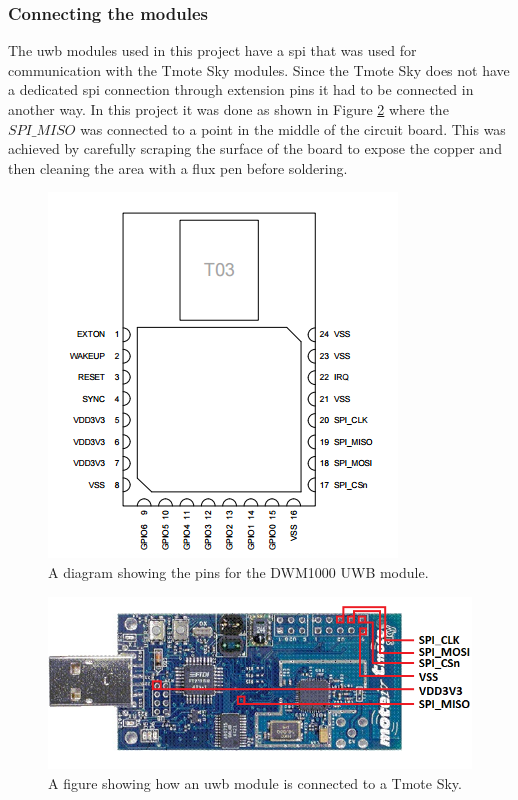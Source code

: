		\subsubsection{Connecting the modules}
			The \gls{uwb} modules used in this project have a \gls{spi} that was used for communication with the Tmote Sky modules. Since the Tmote Sky does not have a dedicated \gls{spi} connection through extension pins it had to be connected in another way. In this project it was done as shown in Figure \ref{fig_Tmote_connections} where the $SPI\_MISO$ was connected to a point in the middle of the circuit board. This was achieved by carefully scraping the surface of the board to expose the copper and then cleaning the area with a flux pen before soldering.
			\begin{figure}[H] 
			  \centering
			      \includegraphics[height=0.6\textwidth]{img/UWB-pinout}
			  \caption{A diagram showing the pins for the DWM1000 UWB module.}
			  \label{fig_UWB_pins}
			\end{figure}
			\begin{figure}[H] 
			  \centering
			      \includegraphics[height=0.45\textwidth]{img/Tmote-connections}
			  \caption{A figure showing how an \gls{uwb} module is connected to a Tmote Sky.}
			  \label{fig_Tmote_connections}
			\end{figure}
